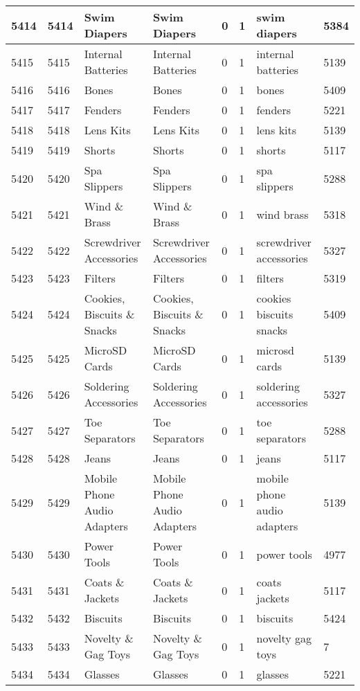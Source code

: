 \begin{longtable}{|l|l|l|l|l|l|l|l|}
5414 & 5414 & Swim Diapers & Swim Diapers & 0 & 1 & swim diapers & 5384 \\ \hline 
5415 & 5415 & Internal Batteries & Internal Batteries & 0 & 1 & internal batteries & 5139 \\ \hline 
5416 & 5416 & Bones & Bones & 0 & 1 & bones & 5409 \\ \hline 
5417 & 5417 & Fenders & Fenders & 0 & 1 & fenders & 5221 \\ \hline 
5418 & 5418 & Lens Kits & Lens Kits & 0 & 1 & lens kits & 5139 \\ \hline 
5419 & 5419 & Shorts & Shorts & 0 & 1 & shorts & 5117 \\ \hline 
5420 & 5420 & Spa Slippers & Spa Slippers & 0 & 1 & spa slippers & 5288 \\ \hline 
5421 & 5421 & Wind \& Brass & Wind \& Brass & 0 & 1 & wind brass & 5318 \\ \hline 
5422 & 5422 & Screwdriver Accessories & Screwdriver Accessories & 0 & 1 & screwdriver accessories & 5327 \\ \hline 
5423 & 5423 & Filters & Filters & 0 & 1 & filters & 5319 \\ \hline 
5424 & 5424 & Cookies, Biscuits \& Snacks & Cookies, Biscuits \& Snacks & 0 & 1 & cookies biscuits snacks & 5409 \\ \hline 
5425 & 5425 & MicroSD Cards & MicroSD Cards & 0 & 1 & microsd cards & 5139 \\ \hline 
5426 & 5426 & Soldering Accessories & Soldering Accessories & 0 & 1 & soldering accessories & 5327 \\ \hline 
5427 & 5427 & Toe Separators & Toe Separators & 0 & 1 & toe separators & 5288 \\ \hline 
5428 & 5428 & Jeans & Jeans & 0 & 1 & jeans & 5117 \\ \hline 
5429 & 5429 & Mobile Phone Audio Adapters & Mobile Phone Audio Adapters & 0 & 1 & mobile phone audio adapters & 5139 \\ \hline 
5430 & 5430 & Power Tools & Power Tools & 0 & 1 & power tools & 4977 \\ \hline 
5431 & 5431 & Coats \& Jackets & Coats \& Jackets & 0 & 1 & coats jackets & 5117 \\ \hline 
5432 & 5432 & Biscuits & Biscuits & 0 & 1 & biscuits & 5424 \\ \hline 
5433 & 5433 & Novelty \& Gag Toys & Novelty \& Gag Toys & 0 & 1 & novelty gag toys & 7 \\ \hline 
5434 & 5434 & Glasses & Glasses & 0 & 1 & glasses & 5221 \\ \hline 

\end{longtable}
